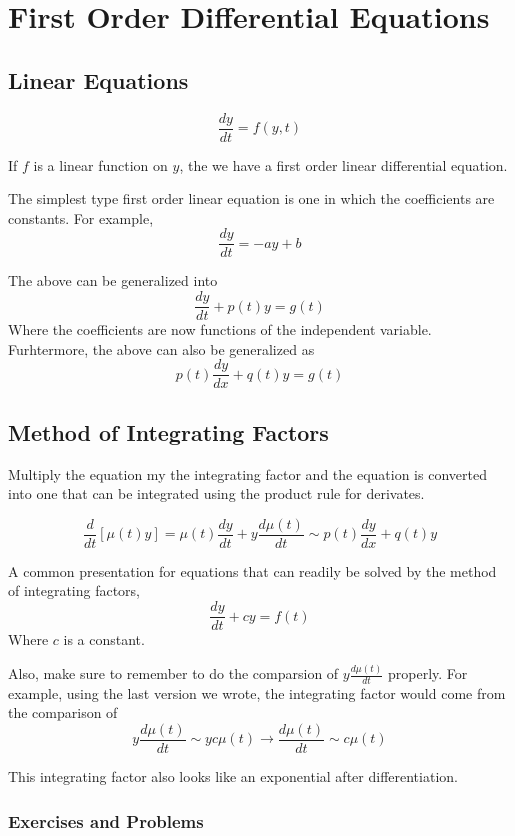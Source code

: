 \section{First Order Differential Equations}

\subsection{Linear Equations}

$$
\frac{dy}{dt} = f(y,t)
$$

If $f$ is a linear function on $y$, the we have a first order linear differential equation.

The simplest type first order linear equation is one in which the coefficients are constants.
For example,
$$
\frac{dy}{dt} = -ay + b
$$

The above can be generalized into
$$
\frac{dy}{dt} + p(t) y = g(t)
$$
Where the coefficients are now functions of the independent variable.
Furhtermore, the above can also be generalized as
$$
p(t) \frac{dy}{dx} + q(t)y = g(t)
$$

\subsection{Method of Integrating Factors}

Multiply the equation my the integrating factor and the equation is converted into one that can
be integrated using the product rule for derivates.


$$
\frac{d}{dt} \left[ \mu(t)y \right] =
\mu(t) \frac{dy}{dt} + y \frac{d\mu(t)}{dt} \sim p(t) \frac{dy}{dx} + q(t)y
$$

A common presentation for equations
that can readily be solved by the method of integrating factors,
$$
\frac{dy}{dt} + cy = f(t)
$$
Where $c$ is a constant.

Also, make sure to remember to do the comparsion of $y \frac{d\mu(t)}{dt}$ properly.
For example, using the last version we wrote, the integrating factor would come from the comparison of
$$
y \frac{d\mu(t)}{dt} \sim y c\mu(t) \rightarrow \frac{d\mu(t)}{dt} \sim c\mu(t)
$$

This integrating factor also looks like an exponential after differentiation.


\subsubsection{Exercises and Problems}


